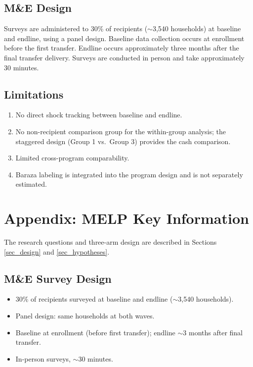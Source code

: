 \documentclass[12pt, oneside]{amsart}
\numberwithin{equation}{section}
\begin{document}
\subsection{M\&E Design}

Surveys are administered to 30\% of recipients ($\sim$3,540 households) at baseline and endline, using a panel design. Baseline data collection occurs at enrollment before the first transfer. Endline occurs approximately three months after the final transfer delivery. Surveys are conducted in person and take approximately 30 minutes.

\subsection{Limitations}

\begin{enumerate}
    \item No direct shock tracking between baseline and endline.
    \item No non-recipient comparison group for the within-group analysis; the staggered design (Group 1 vs.\ Group 3) provides the cash comparison.
    \item Limited cross-program comparability.
    \item Baraza labeling is integrated into the program design and is not separately estimated.
\end{enumerate}

\section{\label{sec_appendix_melp}Appendix: MELP Key Information}

The research questions and three-arm design are described in Sections \ref{sec_design} and \ref{sec_hypotheses}.

\subsection{M\&E Survey Design}

\begin{itemize}
    \item 30\% of recipients surveyed at baseline and endline ($\sim$3,540 households).
    \item Panel design: same households at both waves.
    \item Baseline at enrollment (before first transfer); endline $\sim$3 months after final transfer.
    \item In-person surveys, $\sim$30 minutes.
\end{itemize}
\end{document}

